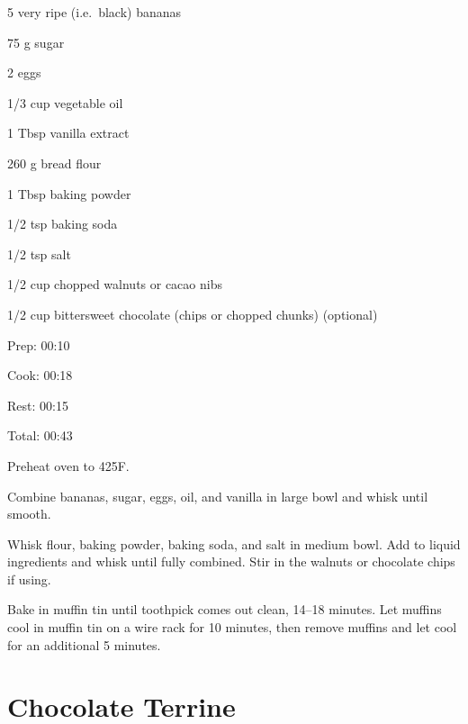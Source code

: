 \documentclass[oneside]{book}  %
\def\thisrecipe{}  %
\newcommand{\recipe}[1]{\section{#1}\def\thisrecipe{: #1}} %
\newcommand{\degF}{\textdegree F\xspace}
\begin{document}
\begin{IT}
  \begin{ingredients}
    \item[5] very ripe (i.e.\ black) bananas
    \item[75 g] sugar
    \item[2] eggs
    \item[1/3 cup] vegetable oil
    \item[1 Tbsp] vanilla extract
    \item[260 g] bread flour
    \item[1 Tbsp] baking powder
    \item[1/2 tsp] baking soda
    \item[1/2 tsp] salt
    \item[1/2 cup] chopped walnuts or cacao nibs
    \item[1/2 cup] bittersweet chocolate (chips or chopped chunks) (optional)
  \end{ingredients}

  \switchcolumn

  \begin{timeline}
    \item[Prep:]  00:10
    \item[Cook:]  00:18
    \item[Rest:]  00:15
    \item[Total:] 00:43
  \end{timeline}
\end{IT}

\begin{directions}
  \item Preheat oven to 425\degF.

  \item Combine bananas, sugar, eggs, oil, and vanilla in large bowl and whisk
  until smooth.

  \item Whisk flour, baking powder, baking soda, and salt in medium bowl. Add to
  liquid ingredients and whisk until fully combined. Stir in the walnuts or
  chocolate chips if using.

  \item Bake in muffin tin until toothpick comes out clean, 14--18 minutes. Let
  muffins cool in muffin tin on a wire rack for 10 minutes, then remove muffins
  and let cool for an additional 5 minutes.
\end{directions}
\recipe{Chocolate Terrine} \label{recipe:chocolate_terrine} %
\end{document}
